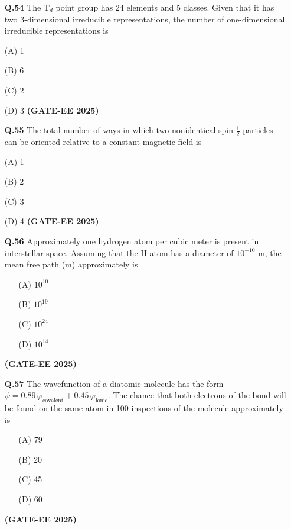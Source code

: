 \documentclass[12pt]{article}
\begin{document}
\begin{enumerate}
\textbf{Q.54} The T$_d$ point group has 24 elements and 5 classes. Given that it has two 3-dimensional irreducible representations, the number of one-dimensional irreducible representations is

\item[(A)] 1
\item[(B)] 6
\item[(C)] 2
\item[(D)] 3   \textbf{(GATE-EE 2025)}


\vspace{0.5cm}

\textbf{Q.55} The total number of ways in which two nonidentical spin $\frac{1}{2}$ particles can be oriented relative to a constant magnetic field is

\item[(A)] 1
\item[(B)] 2
\item[(C)] 3
\item[(D)] 4   \textbf{(GATE-EE 2025)}


\textbf{Q.56} Approximately one hydrogen atom per cubic meter is present in interstellar space. Assuming that the H-atom has a diameter of $10^{-10}$ m, the mean free path (m) approximately is

\begin{enumerate}
\item[(A)] $10^{10}$
\item[(B)] $10^{19}$
\item[(C)] $10^{24}$
\item[(D)] $10^{14}$
\end{enumerate}   \textbf{(GATE-EE 2025)}


\vspace{0.5cm}

\textbf{Q.57} The wavefunction of a diatomic molecule has the form $\psi = 0.89\, \varphi_{\text{covalent}} + 0.45\, \varphi_{\text{ionic}}$. The chance that both electrons of the bond will be found on the same atom in 100 inspections of the molecule approximately is

\begin{enumerate}
\item[(A)] 79
\item[(B)] 20
\item[(C)] 45
\item[(D)] 60
\end{enumerate}   \textbf{(GATE-EE 2025)}


\vspace{0.5cm}


\end{enumerate}
\end{document}
